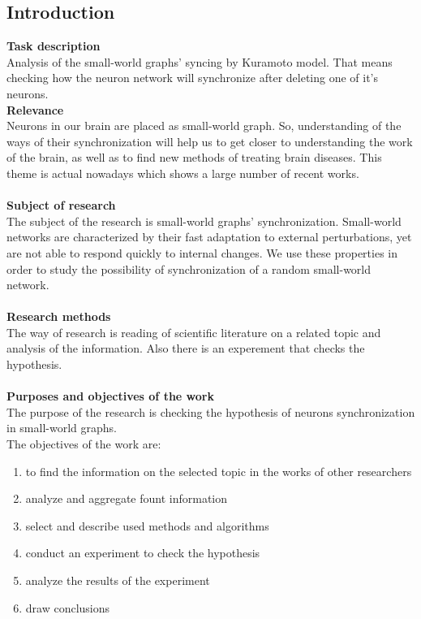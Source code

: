 \documentclass[draft]{article}
\newcommand\tab[1][1cm]{\hspace*{#1}}
\begin{document}
\newpage
\begin{center}
\item\section {Introduction}
\end{center}
\textbf{Task description}\\
\tab Analysis of the small-world graphs' syncing by Kuramoto model. That means checking how the neuron network will synchronize after deleting one of it's neurons.
~\\
\textbf{Relevance}\\
\tab Neurons in our brain are placed as small-world graph. So, understanding of the ways of their synchronization will help us to get closer to understanding the work of the brain, as well as to find new methods of treating brain diseases. This theme is actual nowadays which shows a large number of recent works.\\
~\\
\textbf{Subject of research}\\
\tab The subject of the research is small-world graphs' synchronization. Small-world networks are characterized by their fast adaptation to external perturbations, yet are not able to respond quickly to internal changes. We use these properties in order to study the possibility of synchronization of a random small-world network.\\
~\\
\textbf{Research methods}\\
\tab The way of research is reading of scientific literature on a related topic and analysis of the information. Also there is an experement that checks the hypothesis.\\
~\\
\textbf{Purposes and objectives of the work}\\
\tab The purpose of the research is checking the hypothesis of neurons synchronization in small-world graphs.\\
The objectives of the work are:\\
\begin{enumerate} 
\item to find the information on the selected topic in the works of other researchers
\item analyze and aggregate fount information
\item select and describe used methods and algorithms
\item conduct an experiment to check the hypothesis
\item analyze the results of the experiment
\item draw conclusions
\end{enumerate} 
\end{document}
